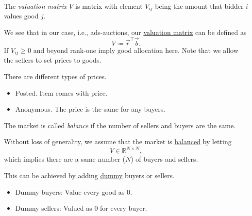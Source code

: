 \begin{definition}\label{def:valuation-matrix}
	The \emph{valuation matrix} \(V\) is matrix with element \(V_{ij}\) being the amount that bidder \(i\) values good \(j\).
\end{definition}

We see that in our case, i.e., ads-auctions, our \hyperref[def:valuation-matrix]{valuation matrix} can be defined as
\[
	V \coloneqq \vec{r} ^{\top} \vec{b}.
\]
If \(V_{ij}\geq 0\) and beyond rank-one imply good allocation here. Note that we allow the sellers to set prices to goods.
\begin{remark}
	There are different types of prices.
	\begin{itemize}
		\item \label{rmk:posted} Posted. Item comes with price.
		\item \label{rmk:anonymous} Anonymous. The price is the same for any buyers.
	\end{itemize}
\end{remark}

\begin{definition}[Balance]\label{def:balance}
	The market is called \emph{balance} if the number of sellers and buyers are the same.
\end{definition}

Without loss of generality, we assume that the market is \hyperref[def:balance]{balanced} by letting
\[
	V\in \mathbb{R}^{N\times N},
\]
which implies there are a same number (\(N\)) of buyers and sellers.

\begin{remark}
	This can be achieved by adding \underline{dummy} buyers or sellers.
	\begin{itemize}
		\item Dummy buyers: Value every good as \(0\).
		\item Dummy sellers: Valued as \(0\) for every buyer.
	\end{itemize}
\end{remark}

